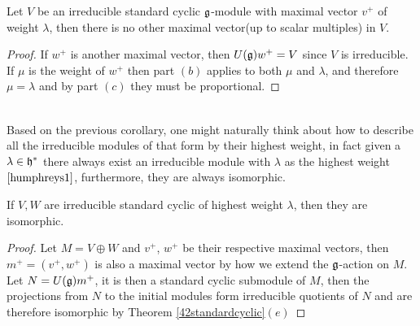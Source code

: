\begin{corol}
	Let $V$ be an irreducible standard cyclic $\mathfrak{g}$-module with maximal vector $v^+$ of weight $\lambda$, then there is no other maximal vector(up to scalar multiples) in $V$.
\end{corol}
\begin{proof}
	If $w^+$ is another maximal vector, then $U(\mathfrak{g})w^+ = V$ since $V$ is irreducible. If $\mu$ is the weight of $w^+$ then part $(b)$ applies to both $\mu$ and $\lambda$, and therefore $\mu=\lambda$ and by part $(c)$ they must be proportional.
\end{proof}\\
Based on the previous corollary, one might naturally think about how to describe all the irreducible modules of that form by their highest weight, in fact given a $\lambda \in \mathfrak{h}^*$ there always exist an irreducible module with $\lambda$ as the highest weight $\cite{humphreys1}$, furthermore, they are always isomorphic.
\begin{teo}
	If $V,W$ are irreducible standard cyclic of highest weight $\lambda$, then they are isomorphic.
\end{teo}
\begin{proof}
	Let $M = V \oplus W$ and $v^+$, $w^+$ be their respective maximal vectors, then $m^+ = (v^+,w^+)$ is also a maximal vector by how we extend the $\mathfrak{g}$-action on $M$.\\
	Let $N = U(\mathfrak{g})m^+$, it is then a standard cyclic submodule of $M$, then the projections from $N$ to the initial modules form irreducible quotients of $N$ and are therefore isomorphic by Theorem \ref{42standardcyclic}$(e)$
\end{proof}
